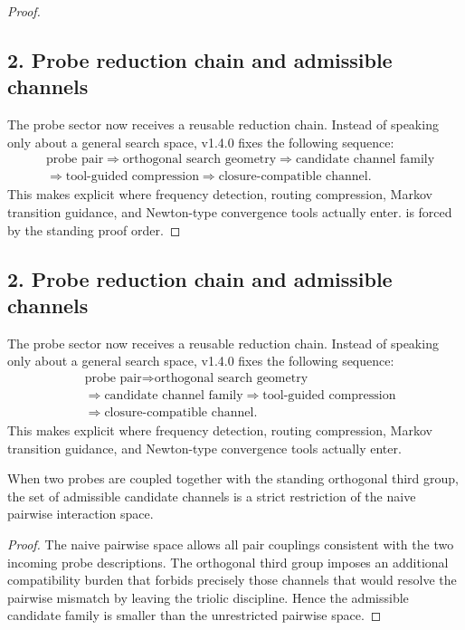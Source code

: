 \begin{proof}
\subsection*{2. Probe reduction chain and admissible channels}
The probe sector now receives a reusable reduction chain. Instead of speaking
only about a general search space, v1.4.0 fixes the following sequence:
\[
\begin{aligned}
&\text{probe pair}
\Longrightarrow
\text{orthogonal search geometry}
\Longrightarrow
\text{candidate channel family}\\[0.2em]
&\Longrightarrow
\text{tool-guided compression}
\Longrightarrow
\text{closure-compatible channel}.
\end{aligned}
\]
This makes explicit where frequency detection, routing compression, Markov
transition guidance, and Newton-type convergence tools actually enter.
is forced by the standing proof order.
\end{proof}

\subsection*{2. Probe reduction chain and admissible channels}
The probe sector now receives a reusable reduction chain. Instead of speaking
only about a general search space, v1.4.0 fixes the following sequence:
\[
\begin{aligned}
&\text{probe pair}
\Longrightarrow \text{orthogonal search geometry}\\[0.15em]
&\Longrightarrow \text{candidate channel family}
\Longrightarrow \text{tool-guided compression}\\[0.15em]
&\Longrightarrow \text{closure-compatible channel}.
\end{aligned}
\]
This makes explicit where frequency detection, routing compression, Markov
transition guidance, and Newton-type convergence tools actually enter.

\begin{lemma}
\label{lem:probe-geometry-restricts}
When two probes are coupled together with the standing orthogonal third group,
the set of admissible candidate channels is a strict restriction of the naive
pairwise interaction space.
\end{lemma}

\begin{proof}
The naive pairwise space allows all pair couplings consistent with the two
incoming probe descriptions. The orthogonal third group imposes an additional
compatibility burden that forbids precisely those channels that would resolve
the pairwise mismatch by leaving the triolic discipline. Hence the admissible
candidate family is smaller than the unrestricted pairwise space.
\end{proof}

